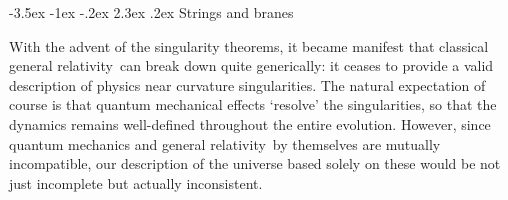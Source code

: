 \documentclass[12pt]{article}
\makeatletter
\renewcommand\section{\@startsection {section}{1}{\z@}%
                                   {-3.5ex \@plus -1ex \@minus -.2ex}%
                                   {2.3ex \@plus.2ex}%
                                   {\normalfont\large\bfseries}}
\def\GR{general relativity}
\makeatother
\begin{document}
\section{Strings and branes}
\label{s:preAC}

With the advent of the singularity theorems, it became manifest that classical \GR\ can break down quite generically: it ceases to provide a valid description of physics near curvature singularities.  The natural expectation of course is that quantum mechanical effects `resolve' the singularities, so that the dynamics remains well-defined throughout the entire evolution.  
However, since quantum mechanics and \GR\ by themselves are mutually incompatible, our description of the universe based solely on these would be not just incomplete but actually inconsistent.
\end{document}

